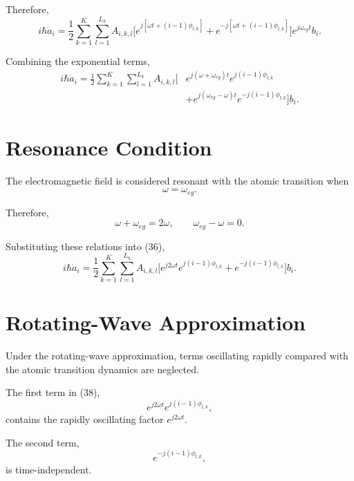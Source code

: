 \documentclass[12pt,a4paper]{article}
\begin{document}
Therefore,
\[
i\hbar\dot a_i
=
\frac{1}{2}
\sum_{k=1}^{K}
\sum_{l=1}^{L_k}
A_{i,k,l}
\Big[
e^{j[\omega t+(i-1)\phi_{l,k}]}
+
e^{-j[\omega t+(i-1)\phi_{l,k}]}
\Big]
e^{j\omega_{eg}t}
b_i.
\]

Combining the exponential terms,
\begin{equation}
\begin{aligned}
i\hbar\dot a_i
=
\frac{1}{2}
\sum_{k=1}^{K}
\sum_{l=1}^{L_k}
A_{i,k,l}
\Big[
&
e^{j(\omega+\omega_{eg})t}
e^{j(i-1)\phi_{l,k}}
\\
&+
e^{j(\omega_{eg}-\omega)t}
e^{-j(i-1)\phi_{l,k}}
\Big]
b_i.
\end{aligned}
\tag{36}
\end{equation}

\section{Resonance Condition}

The electromagnetic field is considered resonant with the atomic
transition when
\begin{equation}
\boxed{
\omega=\omega_{eg}.
}
\tag{37}
\end{equation}

Therefore,
\[
\omega+\omega_{eg}=2\omega,
\qquad
\omega_{eg}-\omega=0.
\]

Substituting these relations into (36),
\begin{equation}
i\hbar\dot a_i
=
\frac{1}{2}
\sum_{k=1}^{K}
\sum_{l=1}^{L_k}
A_{i,k,l}
\Big[
e^{j2\omega t}
e^{j(i-1)\phi_{l,k}}
+
e^{-j(i-1)\phi_{l,k}}
\Big]
b_i.
\tag{38}
\end{equation}

\section{Rotating-Wave Approximation}

Under the rotating-wave approximation, terms oscillating rapidly
compared with the atomic transition dynamics are neglected.

The first term in (38),
\[
e^{j2\omega t}
e^{j(i-1)\phi_{l,k}},
\]
contains the rapidly oscillating factor
\(e^{j2\omega t}\).

The second term,
\[
e^{-j(i-1)\phi_{l,k}},
\]
is time-independent.
\end{document}

